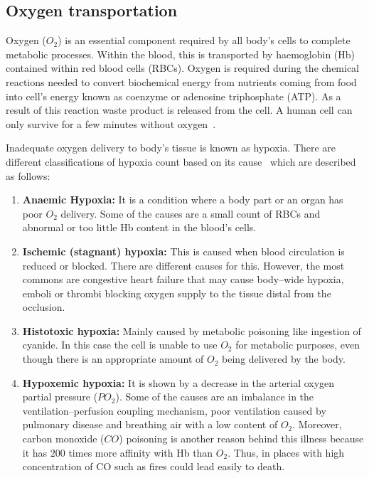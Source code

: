 \subsection{Oxygen transportation}
\label{section2.1.2}
Oxygen ($O_2$) is an essential component required by all body's cells to complete metabolic processes. Within the blood, this is transported by haemoglobin (Hb) contained within red blood cells (RBCs). Oxygen is required during the chemical reactions needed to convert biochemical energy from nutrients coming from food into cell's energy known as coenzyme or adenosine triphosphate (ATP). As a result of this reaction waste product is released from the cell. A human cell can only survive for a few minutes without oxygen~\cite{culmsee2005apoptosis}.

Inadequate oxygen delivery to body's tissue is known as hypoxia. There are different classifications of hypoxia count based on its cause~\cite{marieb2007human} which are described as follows: 

\begin{enumerate}
    \item \textbf{Anaemic Hypoxia:} It is a condition where a body part or an organ has poor $O_2$ delivery. Some of the causes are a small count of RBCs and abnormal or too little Hb content in the blood's cells.
    \item \textbf{Ischemic (stagnant) hypoxia: }This is caused when blood circulation is reduced or blocked. There are different causes for this. However, the most commons are congestive heart failure that may cause body–wide hypoxia, emboli or thrombi blocking oxygen supply to the tissue distal from the occlusion. 
    \item \textbf{Histotoxic hypoxia: }Mainly caused by metabolic poisoning like ingestion of cyanide. In this case the cell is unable to use $O_2$ for metabolic purposes, even though there is an appropriate amount of $O_2$ being delivered by the body.
    \item \textbf{Hypoxemic hypoxia:} It is shown by a decrease in the arterial oxygen partial pressure ($PO_2$). Some of the causes are an imbalance in the ventilation–perfusion coupling mechanism, poor ventilation caused by pulmonary disease and breathing air with a low content of $O_2$. Moreover, carbon monoxide ($CO$) poisoning is another reason behind this illness because it has \num{200} times more affinity with Hb than $O_2$. Thus, in places with high concentration of CO such as fires could lead easily to death.
\end{enumerate}

